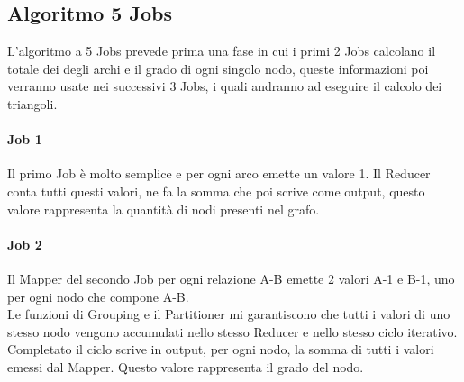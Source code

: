 \documentclass[paper=a4, fontsize=11pt]{scrartcl}	%
\numberwithin{equation}{section}															%
\numberwithin{figure}{section}																%
\numberwithin{table}{section}																%
\begin{document}
\subsection{Algoritmo 5 Jobs}
L'algoritmo a 5 Jobs prevede prima una fase in cui i primi 2 Jobs calcolano il totale dei degli archi e il grado di ogni singolo nodo, queste informazioni poi verranno usate nei successivi 3 Jobs, i quali andranno ad eseguire il calcolo dei triangoli.
\paragraph{Job 1}
Il primo Job è molto semplice e per ogni arco emette un valore 1. Il Reducer conta tutti questi valori, ne fa la somma che poi scrive come output, questo valore rappresenta la quantità di nodi presenti nel grafo.
\paragraph{Job 2}
Il Mapper del secondo Job per ogni relazione A-B emette 2 valori A-1 e B-1, uno per ogni nodo che compone A-B.\\
Le funzioni di Grouping e il Partitioner mi garantiscono che tutti i valori di uno stesso nodo vengono accumulati nello stesso Reducer e nello stesso ciclo iterativo. Completato il ciclo scrive in output, per ogni nodo, la somma di tutti i valori emessi dal Mapper. Questo valore rappresenta il grado del nodo.
\end{document}
